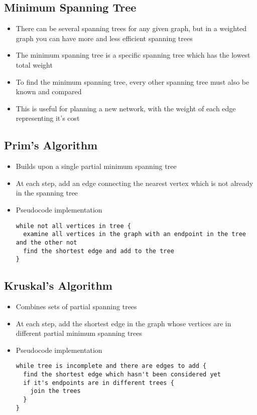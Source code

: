 \subsection*{Minimum Spanning Tree}

\begin{itemize}
  \item There can be several spanning trees for any given graph, but in a weighted graph you can have more and less efficient spanning trees
  \item The minimum spanning tree is a specific spanning tree which has the lowest total weight
  \item To find the minimum spanning tree, every other spanning tree must also be known and compared
  \item This is useful for planning a new network, with the weight of each edge representing it's cost
\end{itemize}

\subsection*{Prim's Algorithm}

\begin{itemize}
  \item Builds upon a single partial minimum spanning tree
  \item At each step, add an edge connecting the nearest vertex which is not already in the spanning tree
  \item Pseudocode implementation
\begin{verbatim}
while not all vertices in tree {
  examine all vertices in the graph with an endpoint in the tree and the other not
  find the shortest edge and add to the tree
}
\end{verbatim}
\end{itemize}

\subsection*{Kruskal's Algorithm}

\begin{itemize}
  \item Combines sets of partial spanning trees
  \item At each step, add the shortest edge in the graph whose vertices are in different partial minimum spanning trees
  \item Pseudocode implementation
\begin{verbatim}
while tree is incomplete and there are edges to add {
  find the shortest edge which hasn't been considered yet
  if it's endpoints are in different trees {
    join the trees
  }
}
\end{verbatim}
\end{itemize}